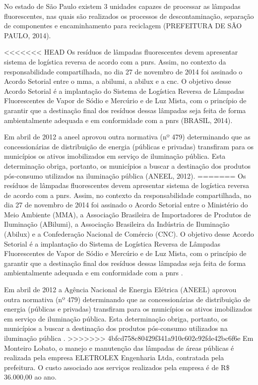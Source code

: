 \begin{description}
	No estado de São Paulo existem 3 unidades capazes de processar as lâmpadas fluorescentes, nas quais são realizados os processos de descontaminação, separação de componentes e encaminhamento para reciclagem (PREFEITURA DE SÃO PAULO, 2014).
	
<<<<<<< HEAD
	Os resíduos de lâmpadas fluorescentes devem apresentar sistema de logística reversa de acordo com a \gls{pnrs}. Assim, no contexto da responsabilidade compartilhada, no dia 27 de novembro de 2014 foi assinado o Acordo Setorial entre o \gls{mma}, a \gls{abilumi}, a \gls{abilux} e a \gls{cnc}. O objetivo desse Acordo Setorial é a implantação do Sistema de Logística Reversa de Lâmpadas Fluorescentes de Vapor de Sódio e Mercúrio e de Luz Mista, com o princípio de garantir que a destinação final dos resíduos dessas lâmpadas seja feita de forma ambientalmente adequada e em conformidade com a \gls{pnrs} (BRASIL, 2014).
	
	Em abril de 2012 a \gls{aneel} aprovou outra normativa (nº 479) determinando que as concessionárias de distribuição de energia (públicas e privadas) transfiram para os municípios os ativos imobilizados em serviço de iluminação pública. Esta determinação obriga, portanto, os municípios a buscar a destinação dos produtos pós-consumo utilizados na iluminação pública (ANEEL, 2012).
=======
	Os resíduos de lâmpadas fluorescentes devem apresentar sistema de logística reversa de acordo com a \gls{pnrs}. Assim, no contexto da responsabilidade compartilhada, no dia 27 de novembro de 2014 foi assinado o Acordo Setorial entre o Ministério do Meio Ambiente (MMA), a Associação Brasileira de Importadores de Produtos de Iluminação (ABilumi), a Associação Brasileira da Indústria de Iluminação (Abilux) e a Confederação Nacional de Comércio (CNC). O objetivo desse Acordo Setorial é a implantação do Sistema de Logística Reversa de Lâmpadas Fluorescentes de Vapor de Sódio e Mercúrio e de Luz Mista, com o princípio de garantir que a destinação final dos resíduos dessas lâmpadas seja feita de forma ambientalmente adequada e em conformidade com a \gls{pnrs} \cite{Acordo2014}.
	
	Em abril de 2012 a Agência Nacional de Energia Elétrica (ANEEL) aprovou outra normativa (nº 479) determinando que as concessionárias de distribuição de energia (públicas e privadas) transfiram para os municípios os ativos imobilizados em serviço de iluminação pública. Esta determinação obriga, portanto, os municípios a buscar a destinação dos produtos pós-consumo utilizados na iluminação pública \cite{ANEEL2012}.
>>>>>>> 4bfcd758c80429f341a910c602c92fde42bc6f6e
	Em Monteiro Lobato, o manejo e manutenção das lâmpadas de áreas públicas é realizada pela empresa ELETROLEX Engenharia Ltda, contratada pela prefeitura. O custo associado aos serviços realizados pela empresa é de R\$ 36.000,00 ao ano.
	

\end{description}
